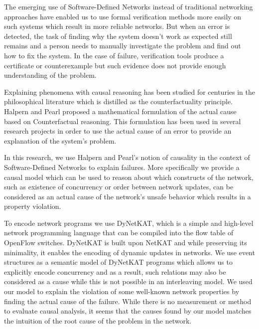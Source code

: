 The emerging use of Software-Defined Networks instead of 
traditional networking approaches have enabled us to 
use formal verification methods more easily on such 
systems which result in more reliable networks.
But when an error is detected, the task of finding why  
the system doesn't work as expected still remains and a person
needs to manually investigate the problem and find out how 
to fix the system. 
In the case of failure, verification tools produce 
a certificate or counterexample but such evidence does not
provide enough understanding of the problem.

Explaining phenomena with causal reasoning has been studied for
centuries in the philosophical literature which is distilled as
the counterfactuality principle.
Halpern and Pearl proposed a mathematical formulation of 
the actual cause based on Counterfactual reasoning.
This formulation has been used in several research projects in 
order to use the actual cause of an error to provide 
an explanation of the system's problem.

In this research, we use Halpern and Pearl's notion of causality 
in the context of Software-Defined Networks to explain failures.
More specifically we provide a causal model which can be used
to reason about which constructs of the network, such as 
existence of concurrency or order between network updates, can
be considered as an actual cause of the network's unsafe behavior
which results in a property violation.

To encode network programs we use DyNetKAT, which is a simple and 
high-level network programming language that can be compiled into
the flow table of OpenFlow switches. DyNetKAT is built upon 
NetKAT and while preserving its minimality, it enables the
 encoding of dynamic updates in networks. We use event structures
as a semantic
model of DyNetKAT programs which allows us to explicitly encode 
concurrency and as a result, such relations may also be 
considered as a cause while this is not possible in an 
interleaving model. 
We used our model to explain the violation of some well-known 
network properties by finding the actual cause of the failure.
While there is no measurement or method to 
evaluate causal analysis, it seems that the causes found by our 
model matches the intuition of the root cause of the problem in 
the network.